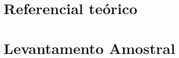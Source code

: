 \part{Referencial teórico}



\part{Levantamento Amostral}




%




\postextual


%  



%

\printindex


